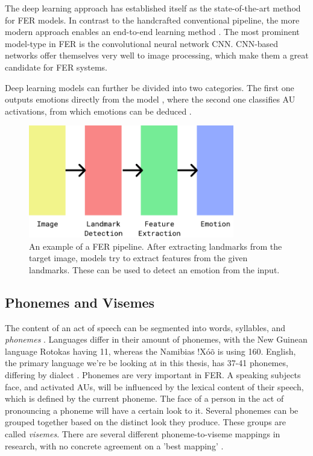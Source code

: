 The deep learning approach has established itself as the state-of-the-art method for FER models. In contrast to the handcrafted conventional pipeline, the more modern approach enables an end-to-end learning method \cite{ko2018brief}. The most prominent model-type in FER is the convolutional neural network CNN. CNN-based networks offer themselves very well to image processing, which make them a great candidate for FER systems. 

Deep learning models can further be divided into two categories. The first one outputs emotions directly from the model \cite{ebrahimi2015recurrent} \cite{kim2017multi} \cite{jung2015joint}, where the second one classifies AU activations, from which emotions can be deduced \cite{breuer2017deep} \cite{zhao2016deep} \cite{chu2017learning}. 

\begin{figure}
    \centering
    \includegraphics[width=0.8\textwidth]{res/PipelinePrototype.pdf}
    \caption{An example of a FER pipeline. After extracting landmarks from the target image, models try to extract features from the given landmarks. These can be used to detect an emotion from the input.}
    \label{fig:pipeline_fer}
\end{figure}

\subsection{Phonemes and Visemes}
The content of an act of speech can be segmented into words, syllables, and \emph{phonemes} \cite{savin1970nonperceptual}. Languages differ in their amount of phonemes, with the New Guinean language Rotokas having 11, whereas the Namibias !Xóõ is using 160. English, the primary language we're be looking at in this thesis, has 37-41 phonemes, differing by dialect \cite{Hayes2009}. Phonemes are very important in FER. A speaking subjects face, and activated AUs, will be influenced by the lexical content of their speech, which is defined by the current phoneme. The face of a person in the act of pronouncing a phoneme will have a certain look to it. Several phonemes can be grouped together based on the distinct look they produce. These groups are called \emph{visemes}. There are several different phoneme-to-viseme mappings in research, with no concrete agreement on a 'best mapping' \cite{cappelletta2012viseme}.


